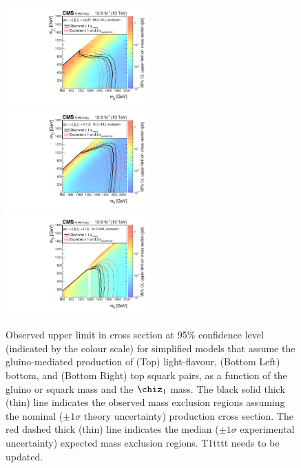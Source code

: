 \begin{figure}[thp!]
  \begin{center}
    \includegraphics[width=0.49\textwidth]{SUS16T1qqqqXSEC.pdf} \\
    \includegraphics[width=0.49\textwidth]{SUS16T1bbbbXSEC.pdf} ~
    \includegraphics[width=0.49\textwidth]{SUS16T1ttttXSEC.pdf} 
    \caption{Observed upper limit in cross section at 95\% confidence
      level (indicated by the colour scale) for simplified models that
      assume the gluino-mediated production of (Top) light-flavour,
      (Bottom Left) bottom, and (Bottom Right) top squark pairs, as a
      function of the gluino or squark mass and the $\chiz_{1}$
      mass. The black solid thick (thin) line indicates the observed
      mass exclusion regions assuming the nominal (${\pm}1 \sigma$
      theory uncertainty) production cross section. The red dashed
      thick (thin) line indicates the median (${\pm}1 \sigma$
      experimental uncertainty) expected mass exclusion
      regions. {\color{red} T1tttt needs to be updated.} 
      \label{fig:limits-sms-gluino} }
  \end{center}
\end{figure}

